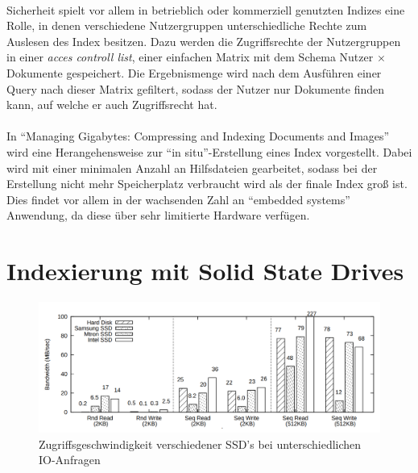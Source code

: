 \paragraph{}
Sicherheit spielt vor allem in betrieblich oder kommerziell genutzten Indizes eine Rolle, in denen verschiedene Nutzergruppen unterschiedliche Rechte zum Auslesen des Index besitzen. Dazu werden die Zugriffsrechte der Nutzergruppen in einer \textit{acces controll list}, einer einfachen Matrix mit dem Schema Nutzer $\times$ Dokumente gespeichert. Die Ergebnismenge wird nach dem Ausführen einer Query nach dieser Matrix gefiltert, sodass der Nutzer nur Dokumente finden kann, auf welche er auch Zugriffsrecht hat.\par

\paragraph{}
In \enquote{Managing Gigabytes: Compressing and Indexing Documents and Images}\cite{managingGig} wird eine Herangehensweise zur \enquote{in situ}-Erstellung eines Index vorgestellt. Dabei wird mit einer minimalen Anzahl an Hilfsdateien gearbeitet, sodass bei der Erstellung nicht mehr Speicherplatz verbraucht wird als der finale Index groß ist. Dies findet vor allem in der wachsenden Zahl an \enquote{embedded systems} Anwendung, da diese über sehr limitierte Hardware verfügen.\par

\section{Indexierung mit Solid State Drives} \label{indexSSD}

\begin{figure}[ht]
  \includegraphics[width=\textwidth]{pdf/ssdperformance.png}
  \caption{Zugriffsgeschwindigkeit verschiedener SSD's bei unterschiedlichen IO-Anfragen}
  \label{fig:accessSSD}
\end{figure}

